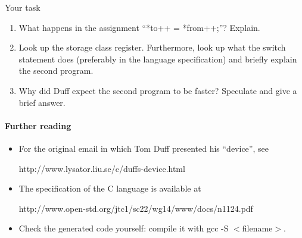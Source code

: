 \documentclass{article}
\begin{document}
Your task
\begin{enumerate}
\item What happens in the assignment ``\textsf{*to++ = *from++;}''?  Explain. 
\item Look up the storage class \textsf{register}. Furthermore, 
look up what the   \textsf{switch} statement does (preferably
in the language specification) and briefly
explain the second program.
\item Why did Duff expect the second program to be faster? Speculate and
give a brief answer.
\end{enumerate}

\paragraph{Further reading}
\begin{itemize}
\item For the original email in which Tom Duff presented his ``device'',
see 

\textsf{http://www.lysator.liu.se/c/duffs-device.html}
\item The specification of the C language is available at 

\textsf{http://www.open-std.org/jtc1/sc22/wg14/www/docs/n1124.pdf}
\item Check the generated code yourself: compile it
with \textsf{gcc -S $<$filename$>$}.
\end{itemize}

\vfill
\end{document}
